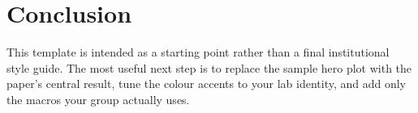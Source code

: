 \section{Conclusion}

This template is intended as a starting point rather than a final institutional style guide. The most useful next step is to replace the sample hero plot with the paper's central result, tune the colour accents to your lab identity, and add only the macros your group actually uses.
